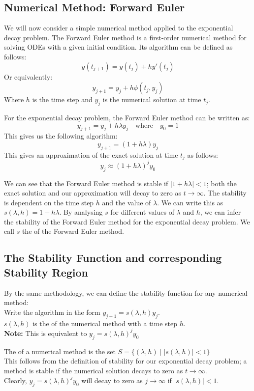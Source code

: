 \newpage
\subsection{Numerical Method: Forward Euler}

\par We will now consider a simple numerical method applied to the exponential decay problem.
The Forward Euler method is a first-order numerical method for solving ODEs with a given initial condition.
Its algorithm can be defined as follows:
\[ y(t_{j+1}) = y(t_j) + h y'(t_j)\]
Or equivalently:
\[ y_{j+1} = y_j + h \phi(t_j, y_j)\]
Where $h$ is the time step and $y_j$ is the numerical solution at time $t_j$.

\par For the exponential decay problem, the Forward Euler method can be written as:
\[ y_{j+1} = y_j + h \lambda y_j \quad \text{where} \quad y_0 = 1\]
This gives us the following algorithm:
\[ y_{j+1} = (1 + h \lambda) y_j\]
This gives an approximation of the exact solution at time $t_j$ as follows:
\[ y_{j} \approx {(1 + h \lambda)}^j y_0\]

\par We can see that the Forward Euler method is stable if $|1 + h \lambda| < 1$; both the exact solution and our approximation will decay to zero as $t \rightarrow \infty$.
The stability is dependent on the time step $h$ and the value of $\lambda$.
We can write this as $s(\lambda, h) = 1 + h \lambda$.
By analysing $s$ for different values of $\lambda$ and $h$, we can infer the stability of the Forward Euler method for the exponential decay problem.
We call $s$ the  of the Forward Euler method.



\subsection{The Stability Function and corresponding Stability Region}
\par By the same methodology, we can define the stability function for any numerical method:\\
Write the algorithm in the form $y_{j+1} = s(\lambda, h) y_{j}$.\\
$s(\lambda, h)$ is the  of the numerical method with a time step $h$.\\
\textbf{Note:} This is equivalent to $y_{j} = {s(\lambda,h)}^{j} y_0$

\par The  of a numerical method is the set $S = \Big\{ (\lambda, h) \;\Big|\; |s(\lambda, h)| < 1\Big\}$\\
This follows from the definition of stability for our exponential decay problem; a method is stable if the numerical solution decays to zero as $t \rightarrow \infty$.\\
Clearly, $y_{j} = {s(\lambda,h)}^{j} y_0$ will decay to zero as $j \rightarrow \infty$ if $|s(\lambda, h)| < 1$.

